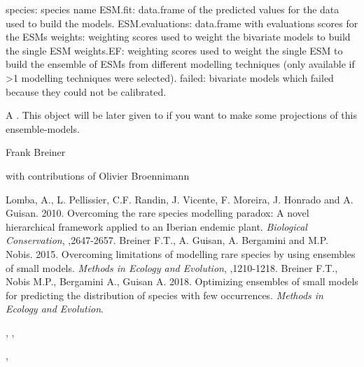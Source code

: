 \documentclass[a4paper]{book}
\begin{document}
\begin{Value}

species:          species name
ESM.fit:          data.frame of the predicted values for the data used to build the models.
ESM.evaluations:  data.frame with evaluations scores for the ESMs
weights:          weighting scores used to weight the bivariate models to build the single ESM
weights.EF:       weighting scores used to weight the single ESM to build the ensemble of ESMs from different modelling techniques (only available if >1 modelling techniques were selected).
failed:           bivariate models which failed because they could not be calibrated.


A . This object will be later given to  if you want to make some projections of this ensemble-models.

\end{Value}
%
\begin{Author}\relax
Frank Breiner  

with contributions of Olivier Broennimann 

\end{Author}
%
\begin{References}\relax

Lomba, A., L. Pellissier, C.F. Randin, J. Vicente, F. Moreira, J. Honrado and A. Guisan. 2010. Overcoming the rare species modelling paradox: A novel hierarchical framework applied to an Iberian endemic plant. \emph{Biological Conservation}, ,2647-2657.
Breiner F.T., A. Guisan, A. Bergamini and M.P. Nobis. 2015. Overcoming limitations of modelling rare species by using ensembles of small models. \emph{Methods in Ecology and Evolution}, ,1210-1218.
Breiner F.T., Nobis M.P., Bergamini A., Guisan A. 2018. Optimizing ensembles of small models for predicting the distribution of species with few occurrences. \emph{Methods in Ecology and Evolution}. 
\end{References}
%
\begin{SeeAlso}\relax
{}, , 

, 

\end{SeeAlso}
\end{document}
